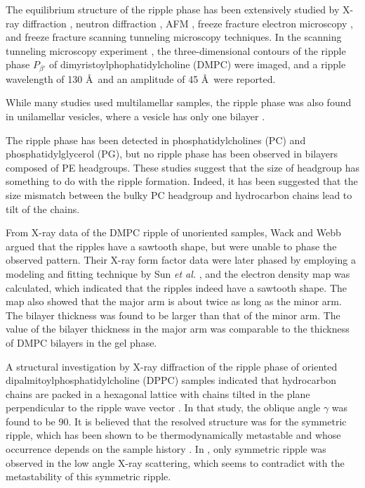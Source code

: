 The equilibrium structure of the ripple phase has been extensively studied by
X-ray diffraction \cite{ref:Janiak76,ref:Janiak79,ref:Tardieu73,ref:Wack89,ref:Yao91,ref:Sun96,ref:Cunningham98},
neutron diffraction \cite{ref:Mortensen88,ref:Bradshaw89}, 
AFM \cite{}, freeze fracture electron microscopy \cite{ref:Woodward96},
and freeze fracture scanning tunneling microscopy \cite{} techniques.
In the scanning tunneling microscopy experiment \cite{ref:Zasadzinski88}, 
the three-dimensional contours of the ripple phase $P_{\beta'}$ of
dimyristoylphophatidylcholine (DMPC) were imaged, and
a ripple wavelength of 130 \AA\ and an amplitude of 45 \AA\ were reported.

While many studies used multilamellar samples, the ripple phase was also found in
unilamellar vesicles, where a vesicle has only one bilayer 
\cite{ref:Mason99}.

The ripple phase has been detected in
phosphatidylcholines (PC) and phosphatidylglycerol (PG),
but no ripple phase has been observed in bilayers composed of PE headgroups.
These studies suggest that the size of headgroup has something to do with
the ripple formation. Indeed, it has been suggested that the size mismatch
between the bulky PC headgroup and hydrocarbon chains lead to tilt of 
the chains. 

From X-ray data of the DMPC ripple of unoriented samples, 
Wack and Webb \cite{ref:Wack89} argued that the ripples have a sawtooth shape,
but were unable to phase the observed pattern.
Their X-ray form factor data were later
phased by employing a modeling and fitting technique by Sun \textit{et al.}
\cite{ref:Sun96}, and the electron density map was calculated, which indicated that  
the ripples indeed have a sawtooth shape. The map also showed that
the major arm is about twice as long as the minor arm. The bilayer
thickness was found to be larger than that of the minor arm. The
value of the bilayer thickness in the major arm was comparable to the
thickness of DMPC bilayers in the gel phase.

A structural investigation by X-ray diffraction of the ripple phase of
oriented dipalmitoylphosphatidylcholine (DPPC) samples indicated that
hydrocarbon chains are packed in a hexagonal lattice with chains
tilted in the plane perpendicular to the ripple wave vector \cite{ref:Hentschel91}.
In that study, the oblique angle $\gamma$ was found to be 90\textdegree.
It is believed that the resolved structure was for the symmetric ripple,
which has been shown to be thermodynamically metastable and whose occurrence
depends on the sample history \cite{ref:Katsaras00}. 
In \cite{ref:Hentschel91}, only symmetric ripple was observed in the low angle
X-ray scattering, which seems to contradict with the metastability of this 
symmetric ripple.

